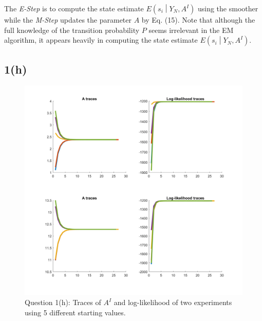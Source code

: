\documentclass[a4paper, 11pt]{article}
\begin{document}
The \textit{E-Step} is to compute the state estimate $E\left(s_i\middle| Y_N, A^I \right)$ using the smoother while the \textit{M-Step} updates the parameter $A$ by Eq. (15). Note that although the full knowledge of the transition probability $P$ seems irrelevant in the EM algorithm, it appears heavily in computing the state estimate $E\left(s_i\middle| Y_N, A^I \right)$.


\subsection*{1(h)}

\begin{figure}
	\begin{center}
		\includegraphics[width=7in]{q1h.png}
		\caption{Question 1(h): Traces of $A^I$ and log-likelihood of two experiments using 5 different starting values. }
	\end{center}
\end{figure}
\end{document}
